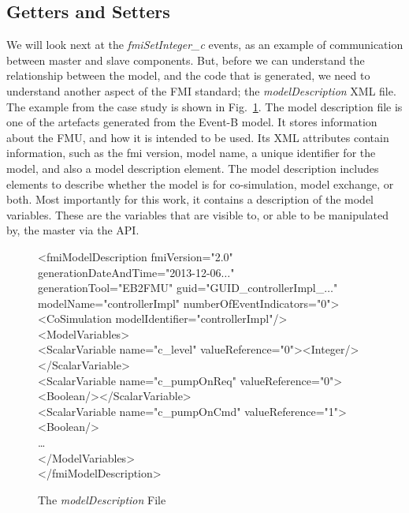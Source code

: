 \documentclass{llncs}%
\begin{document}
\subsection{Getters and Setters}
We will look next at the \emph{fmiSetInteger\_c} events, as an example of communication between master and slave components. But, before we can understand the relationship between the model, and the code that is generated, we need to understand another aspect of the FMI standard; the \emph{modelDescription} XML file. The example from the case study is shown in Fig.~\ref{fig:modelDesc}. The model description file is one of the artefacts generated from the Event-B model. It stores information about the FMU, and how it is intended to be used. Its XML attributes contain information, such as the fmi version, model name, a unique identifier for the model, and also a model description element. The model description includes elements to describe whether the model is for co-simulation, model exchange, or both. Most importantly for this work, it contains a description of the model variables. These are the variables that are visible to, or able to be manipulated by, the master via the API. 
%
\begin{figure}
\centering
\begin{minipage}{\textwidth}
<fmiModelDescription fmiVersion="2.0"  generationDateAndTime="2013-12-06$\ldots$" \\
\hspace*{0.2cm}generationTool="EB2FMU" guid="GUID\_controllerImpl\_$\ldots$" \\
\hspace*{0.2cm}modelName="controllerImpl" numberOfEventIndicators="0">\\
\hspace*{0.2cm} <CoSimulation modelIdentifier="controllerImpl"/>\\
\hspace*{0.2cm}<ModelVariables>\\
\hspace*{0.4cm}<ScalarVariable name="c\_level" valueReference="0"><Integer/></ScalarVariable>\\
\hspace*{0.4cm}<ScalarVariable name="c\_pumpOnReq" valueReference="0"><Boolean/></ScalarVariable>\\
\hspace*{0.4cm}<ScalarVariable name="c\_pumpOnCmd" valueReference="1"><Boolean/>\\
\hspace*{0.4cm}\ldots\\
\hspace*{0.2cm}</ModelVariables>\\
</fmiModelDescription>
\end{minipage}
\caption{The \emph{modelDescription} File}
\label{fig:modelDesc}
\end{figure}
%
%
\end{document}
